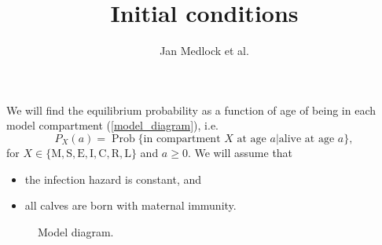 \documentclass[12pt]{article}
\title{Initial conditions}
\author{Jan Medlock et al.}
\DeclareMathOperator{\Prob}{Prob}
\begin{document}
\maketitle

We will find the equilibrium probability as a function of age of being
in each model compartment (\autoref{model_diagram}), i.e.
\begin{equation}
  P_X(a) = \Prob\{\text{in compartment $X$ at age $a$}|\text{alive at
    age $a$}\},
\end{equation}
for $X \in \{\mathrm{M}, \mathrm{S}, \mathrm{E}, \mathrm{I},
\mathrm{C}, \mathrm{R}, \mathrm{L}\}$ and $a \geq 0$.
We will assume that
\begin{itemize}
\item the infection hazard is constant, and
\item all calves are born with maternal immunity.
\end{itemize}

\begin{figure}
  \begin{center}
    
  \end{center}
  \caption{Model diagram.}
  \label{model_diagram}
\end{figure}
\end{document}
